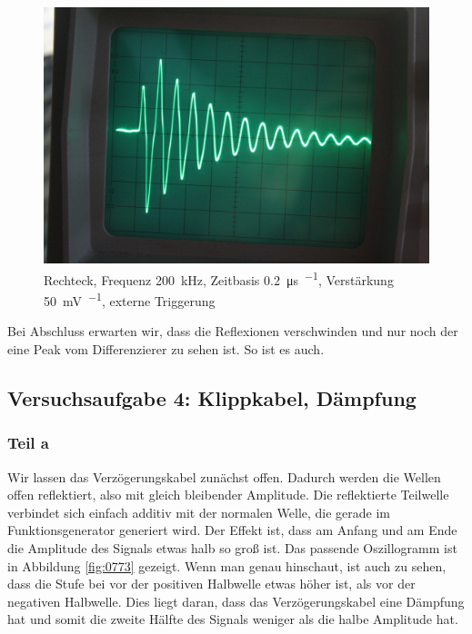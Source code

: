 \begin{figure}
	\centering
	\begin{minipage}{.45\linewidth}
	\end{minipage}
	\hfill
	\begin{minipage}{.45\linewidth}
	\includegraphics[width=\linewidth]{Fotos/IMG_0772-1500.jpg}
	\end{minipage}
	\caption{%
		Rechteck, Frequenz \SI{200}{\kilo\hertz},
		Zeitbasis \SI{.2}{\micro\second\per\division},
		Verstärkung \SI{50}{\milli\volt\per\division},
		externe Triggerung
	}
	\label{fig:0772}
\end{figure}

Bei Abschluss erwarten wir, dass die Reflexionen verschwinden und nur noch der
eine Peak vom Differenzierer zu sehen ist. So ist es auch.

\FloatBarrier
\subsection{Versuchsaufgabe 4: Klippkabel, Dämpfung}

\FloatBarrier
\subsubsection{Teil a}

Wir lassen das Verzögerungskabel zunächst offen. Dadurch werden die Wellen
offen reflektiert, also mit gleich bleibender Amplitude. Die reflektierte
Teilwelle verbindet sich einfach additiv mit der normalen Welle, die gerade im
Funktionsgenerator generiert wird. Der Effekt ist, dass am Anfang und am Ende
die Amplitude des Signals etwas halb so groß ist. Das passende Oszillogramm ist
in Abbildung \ref{fig:0773} gezeigt. Wenn man genau hinschaut, ist auch zu
sehen, dass die Stufe bei vor der positiven Halbwelle etwas höher ist, als vor
der negativen Halbwelle. Dies liegt daran, dass das Verzögerungskabel eine
Dämpfung hat und somit die zweite Hälfte des Signals weniger als die halbe
Amplitude hat.

